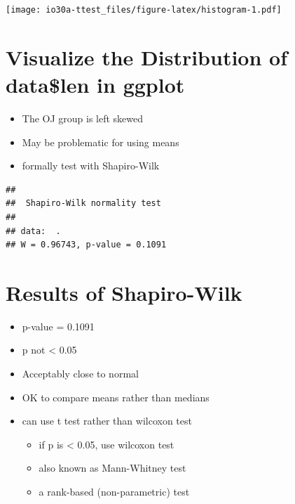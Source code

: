 \documentclass[
]{book}
\newenvironment{Shaded}{\begin{snugshade}}{\end{snugshade}}
\newcommand{\KeywordTok}[1]{\textcolor[rgb]{0.13,0.29,0.53}{\textbf{#1}}}
\newcommand{\NormalTok}[1]{#1}
\newcommand{\OperatorTok}[1]{\textcolor[rgb]{0.81,0.36,0.00}{\textbf{#1}}}
\newcommand{\StringTok}[1]{\textcolor[rgb]{0.31,0.60,0.02}{#1}}
\providecommand{\tightlist}{%
  \setlength{\itemsep}{0pt}\setlength{\parskip}{0pt}}
\begin{document}
\texttt{[image: io30a-ttest\_files/figure-latex/histogram-1.pdf]}

\hypertarget{visualize-the-distribution-of-datalen-in-ggplot-3}{%
\section{Visualize the Distribution of data\$len in ggplot}\label{visualize-the-distribution-of-datalen-in-ggplot-3}}

\begin{itemize}
\tightlist
\item
  The OJ group is left skewed
\item
  May be problematic for using means
\item
  formally test with Shapiro-Wilk
\end{itemize}

\begin{Shaded}
\end{Shaded}

\begin{verbatim}
## 
##  Shapiro-Wilk normality test
## 
## data:  .
## W = 0.96743, p-value = 0.1091
\end{verbatim}

\hypertarget{results-of-shapiro-wilk-1}{%
\section{Results of Shapiro-Wilk}\label{results-of-shapiro-wilk-1}}

\begin{itemize}
\tightlist
\item
  p-value = 0.1091
\item
  p not \textless{} 0.05
\item
  Acceptably close to normal
\item
  OK to compare means rather than medians
\item
  can use t test rather than wilcoxon test

  \begin{itemize}
  \tightlist
  \item
    if p is \textless{} 0.05, use wilcoxon test
  \item
    also known as Mann-Whitney test
  \item
    a rank-based (non-parametric) test
  \end{itemize}
\end{itemize}
\end{document}
